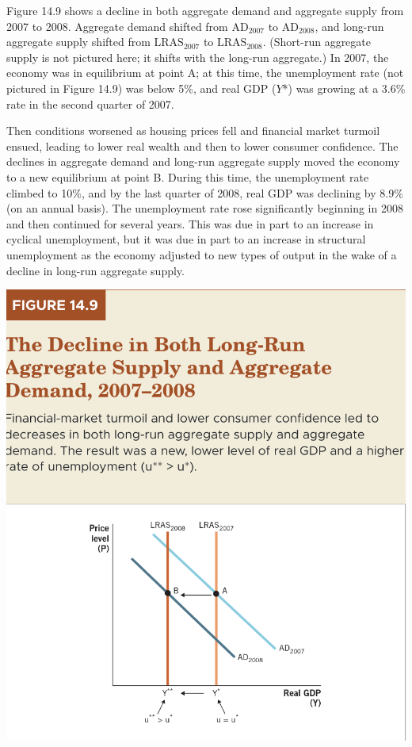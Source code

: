 \documentclass[11pt]{article} %
\begin{document}
Figure 14.9 shows a decline in both aggregate demand and aggregate supply from 2007 to 2008. Aggregate demand shifted from \(\text{AD}_{2007}\) to \(\text{AD}_{2008}\), and long-run aggregate supply shifted from \(\text{LRAS}_{2007}\) to \(\text{LRAS}_{2008}\). (Short-run aggregate supply is not pictured here; it shifts with the long-run aggregate.) In 2007, the economy was in equilibrium at point A; at this time, the unemployment rate (not pictured in Figure 14.9) was below 5\%, and real GDP (\(Y\)*) was growing at a 3.6\% rate in the second quarter of 2007.

Then conditions worsened as housing prices fell and financial market turmoil ensued, leading to lower real wealth and then to lower consumer confidence. The declines in aggregate demand and long-run aggregate supply moved the economy to a new equilibrium at point B. During this time, the unemployment rate climbed to 10\%, and by the last quarter of 2008, real GDP was declining by 8.9\% (on an annual basis). The unemployment rate rose significantly beginning in 2008 and then continued for several years. This was due in part to an increase in cyclical unemployment, but it was due in part to an increase in structural unemployment as the economy adjusted to new types of output in the wake of a decline in long-run aggregate supply.

\begin{center}
\includegraphics[scale=0.5]{images/Figure 14.9.png} 
\end{center}
\end{document}
